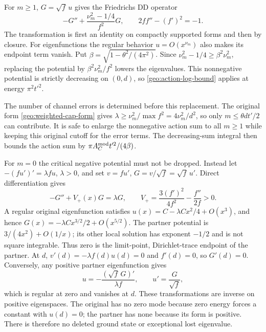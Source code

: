 \documentclass[11pt,reqno]{amsart}
\numberwithin{equation}{section}
\begin{document}
For $m\ge1$, $G=\sqrt f\,u$ gives the Friedrichs DD operator
\[
 -G''+\frac{\nu_m^2-1/4}{f^2}G,
 \qquad 2ff''-(f')^2=-1.
\]
The transformation is first an identity on compactly supported forms
and then by closure.  For eigenfunctions the regular behavior
$u=O(x^{\nu_m})$ also makes its endpoint term vanish.
Put $\beta=\sqrt{1-\theta^2/(4\pi^2)}$.  Since
$\nu_m^2-1/4\ge\beta^2\nu_m^2$, replacing the potential by
$\beta^2\nu_m^2/f^2$ lowers the eigenvalues.  This nonnegative potential
is strictly decreasing on $(0,d)$, so \eqref{geo:action-log-bound}
applies at energy $\pi^2t'^2$.

The number of channel errors is determined before this replacement.
The original form \eqref{geo:weighted-cap-form} gives
$\lambda\ge\nu_m^2/\max f^2=4\nu_m^2/d^2$, so only
$m\le\theta dt'/2$ can contribute.  It is safe to enlarge the
nonnegative action sum to all $m\ge1$ while keeping this original
cutoff for the error terms.  The decreasing-sum integral then bounds
the action sum by $\pi A_C^{\rm mod}t'^2/(4\beta)$.

For $m=0$ the critical negative potential must not be dropped.  Instead
let $-(fu')'=\lambda fu$, $\lambda>0$, and set
$v=fu'$, $G=v/\sqrt f=\sqrt f\,u'$.  Direct differentiation gives
\begin{equation}\label{geo:partner}
 -G''+V_+(x)G=\lambda G,
 \qquad
 V_+=\frac{3(f')^2}{4f^2}-\frac{f''}{2f}>0.
\end{equation}
A regular original eigenfunction satisfies
$u(x)=C-\lambda Cx^2/4+O(x^3)$, and hence
$G(x)=-\lambda Cx^{3/2}/2+O(x^{5/2})$.
The partner potential is $3/(4x^2)+O(1/x)$; its other local solution
has exponent $-1/2$ and is not square integrable.  Thus zero is the
limit-point, Dirichlet-trace endpoint of the partner.  At $d$,
$v'(d)=-\lambda f(d)u(d)=0$ and $f'(d)=0$, so $G'(d)=0$.
Conversely, any positive partner eigenfunction gives
\[
 u=-\frac{(\sqrt f\,G)'}{\lambda f},\qquad u'=\frac G{\sqrt f},
\]
which is regular at zero and vanishes at $d$.  These transformations
are inverse on positive eigenspaces.  The original has no zero mode
because zero energy forces a constant with $u(d)=0$; the partner has
none because its form is positive.  There is therefore no deleted
ground state or exceptional lost eigenvalue.
\end{document}
